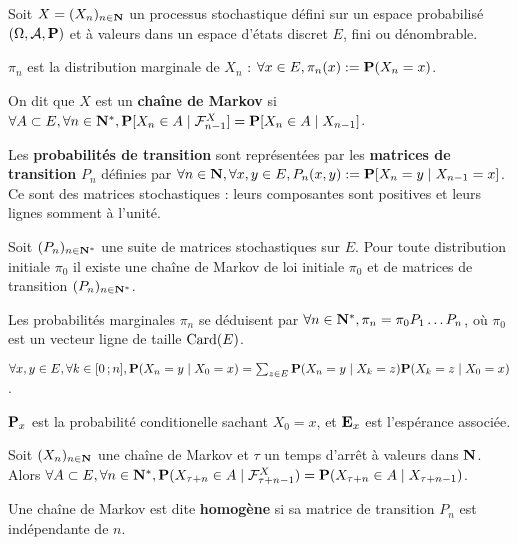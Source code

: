 Soit $X = (X_n)_{n \in \mathbf{N}}$ un processus stochastique défini sur un espace probabilisé $(\Omega,\mathcal{A},\mathbf{P})$ et à valeurs dans un espace d'états discret $E$, fini ou dénombrable.

\begin{note}
	$\pi_n$ est la distribution marginale de $X_n$ : $\forall x \in E, \pi_n(x) := \mathbf{P}(X_n = x)$.
\end{note}

\begin{defn}
	On dit que $X$ est un \textbf{chaîne de Markov} si $\forall A \subset E, \forall n \in \mathbf{N}^*, \mathbf{P}[X_n \in A \mid \mathcal{F}_{n - 1}^X] = \mathbf{P}[X_n \in A \mid X_{n - 1}]$.
\end{defn}

Les \textbf{probabilités de transition} sont représentées par les \textbf{matrices de transition} $P_n$ définies par $\forall n \in \mathbf{N}, \forall x,y \in E, P_n(x,y) := \mathbf{P} [X_n = y \mid X_{n - 1} = x]$.
Ce sont des matrices stochastiques : leurs composantes sont positives et leurs lignes somment à l'unité.

\begin{pop}
	Soit $(P_n)_{n \in \mathbf{N}^*}$ une suite de matrices stochastiques sur $E$.
	Pour toute distribution initiale $\pi_0$ il existe une chaîne de Markov de loi initiale $\pi_0$ et de matrices de transition $(P_n)_{n \in \mathbf{N}^*}$.
\end{pop}

Les probabilités marginales $\pi_n$ se déduisent par $\forall n \in \mathbf{N}^*, \pi_n = \pi_0 P_1 \ldots P_n$, où $\pi_0$ est un vecteur ligne de taille $\operatorname{Card}(E)$.

\begin{pop}
	$\forall x,y \in E, \forall k \in \mathopen{}\mathclose{\left[0\mathclose{}\mathpunct{};n\right]}, \mathbf{P}(X_n = y \mid X_0 = x) = \sum_{z \in E} \mathbf{P}(X_n = y \mid X_k = z) \mathbf{P}(X_k = z \mid X_0 = x)$.
\end{pop}

\begin{note}
	$\mathbf{P}_x$ est la probabilité conditionelle sachant $X_0 = x$, et $\mathbf{E}_x$ est l'espérance associée.
\end{note}

\begin{thm}
	Soit $(X_n)_{n \in \mathbf{N}}$ une chaîne de Markov et $\tau$ un temps d'arrêt à valeurs dans $\mathbf{N}$.
	Alors $\forall A \subset E, \forall n \in \mathbf{N}^*, \mathbf{P}(X_{\tau + n} \in A \mid \mathcal{F}_{\tau + n - 1}^X) = \mathbf{P}(X_{\tau + n} \in A \mid X_{\tau + n - 1})$.
\end{thm}

\begin{defn}
	Une chaîne de Markov est dite \textbf{homogène} si sa matrice de transition $P_n$ est indépendante de $n$.
\end{defn}
